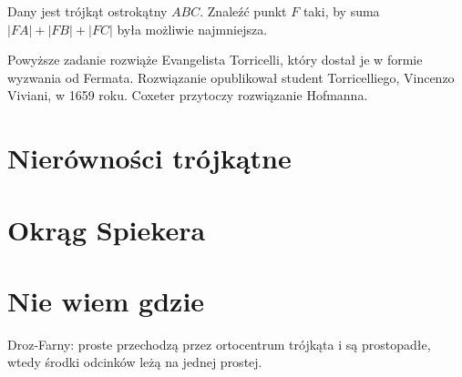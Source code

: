 \begin{problem}
	\label{punkt_fermata}
	Dany jest trójkąt ostrokątny $ABC$.
	Znaleźć punkt $F$ taki, by suma $|FA| + |FB| + |FC|$ była możliwie najmniejsza.
%
\end{problem}


Powyższe zadanie rozwiąże Evangelista Torricelli, który dostał je w formie wyzwania od Fermata.
%
Rozwiązanie opublikował student Torricelliego, Vincenzo Viviani, w 1659 roku.
Coxeter \cite[s. 37]{coxeter_1967} przytoczy rozwiązanie Hofmanna. %

\section{Nierówności trójkątne}


\section{Okrąg Spiekera}


\section{Nie wiem gdzie}

Droz-Farny: proste przechodzą przez ortocentrum trójkąta i są prostopadłe, wtedy środki odcinków leżą na jednej prostej. %

%






